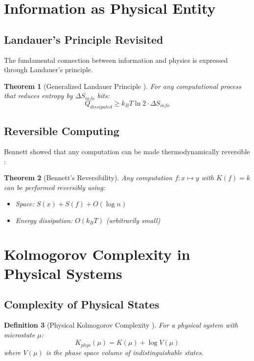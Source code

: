 \documentclass[12pt,a4paper]{report}
\newtheorem{theorem}{Theorem}[chapter]
\newtheorem{definition}[theorem]{Definition}
\begin{document}
\section{Information as Physical Entity}

\subsection{Landauer's Principle Revisited}

The fundamental connection between information and physics is expressed through Landauer's principle.

\begin{theorem}[Generalized Landauer Principle \cite{maroney2009generalizing}]
For any computational process that reduces entropy by $\Delta S_{info}$ bits:
\begin{equation}
Q_{dissipated} \geq k_B T \ln 2 \cdot \Delta S_{info}
\end{equation}
\end{theorem}

\subsection{Reversible Computing}

Bennett showed that any computation can be made thermodynamically reversible \cite{bennett1973logical}:

\begin{theorem}[Bennett's Reversibility]
Any computation $f: x \mapsto y$ with $K(f) = k$ can be performed reversibly using:
\begin{itemize}
    \item Space: $S(x) + S(f) + O(\log n)$
    \item Energy dissipation: $O(k_B T)$ (arbitrarily small)
\end{itemize}
\end{theorem}

\section{Kolmogorov Complexity in Physical Systems}

\subsection{Complexity of Physical States}

\begin{definition}[Physical Kolmogorov Complexity \cite{zurek2023PhysicalComplexity}]
For a physical system with microstate $\mu$:
\begin{equation}
K_{phys}(\mu) = K(\mu) + \log V(\mu)
\end{equation}
where $V(\mu)$ is the phase space volume of indistinguishable states.
\end{definition}
\end{document}

